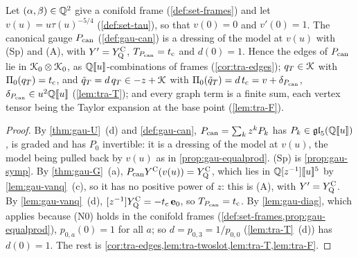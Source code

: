 \begin{prop}
\label{prop:tra-can}
Let $(\alpha,\beta)\in\mathbb{Q}^2$ give a conifold frame (\cref{def:set-frames}) and let $v(u) = u\tau(u)^{-5/4}$ (\cref{def:set-tau}), so that $v(0) = 0$ and $v'(0) = 1$. The canonical gauge $P_{\mathrm{can}}$ (\cref{def:gau-can}) is a dressing of the model at $v(u)$ with (Sp) and (A), with $Y' = Y^{\mathrm{C}}_{\mathrm{Q}}$, $T_{P_{\mathrm{can}}} = t_{\mathrm{c}}$ and $d(0) = 1$. Hence the edges of $P_{\mathrm{can}}$ lie in $\mathcal{K}_{0}\otimes\mathcal{K}_{0}$, as $\mathbb{Q}[\![ u ]\!]$-combinations of frames (\cref{cor:tra-edges}); $q_T\in\mathcal{K}$ with $\Pi_0(q_T) = t_{\mathrm{c}}$, and $\tilde q_T = d\,q_T\in -z+\mathcal{K}$ with $\Pi_0(\tilde q_T) = d\,t_{\mathrm{c}} = v+\delta_{P_{\mathrm{can}}}$, $\delta_{P_{\mathrm{can}}}\in u^2\mathbb{Q}[\![ u ]\!]$ (\cref{lem:tra-T}); and every graph term is a finite sum, each vertex tensor being the Taylor expansion at the base point (\cref{lem:tra-F}).
\end{prop}

\begin{proof}
By \cref{thm:gau-U}~(d) and \cref{def:gau-can}, $P_{\mathrm{can}} = \sum_kz^kP_k$ has $P_k\in\mathfrak{gl}_5(\mathbb{Q}[\![ u ]\!])$, is graded and has $P_0$ invertible: it is a dressing of the model at $v(u)$, the model being pulled back by $v(u)$ as in \cref{prop:gau-equalprod}. (Sp) is \cref{prop:gau-symp}. By \cref{thm:gau-G}~(a), $P_{\mathrm{can}}Y^{\mathrm{C}}(v(u)) = Y^{\mathrm{C}}_{\mathrm{Q}}$, which lies in $\mathbb{Q}[z^{-1}][\![ u ]\!]^5$ by \cref{lem:gau-vanq}~(c), so it has no positive power of $z$: this is (A), with $Y' = Y^{\mathrm{C}}_{\mathrm{Q}}$. By \cref{lem:gau-vanq}~(d), $[z^{-1}]Y^{\mathrm{C}}_{\mathrm{Q}} = -t_{\mathrm{c}}\,\mathbf e_0$, so $T_{P_{\mathrm{can}}} = t_{\mathrm{c}}$. By \cref{lem:gau-diag}, which applies because (N0) holds in the conifold frames (\cref{def:set-frames,prop:gau-equalprod}), $p_{0,a}(0) = 1$ for all $a$; so $d = p_{0,3} = 1/p_{0,0}$ (\cref{lem:tra-T}~(d)) has $d(0) = 1$. The rest is \cref{cor:tra-edges,lem:tra-twoslot,lem:tra-T,lem:tra-F}.
\end{proof}
